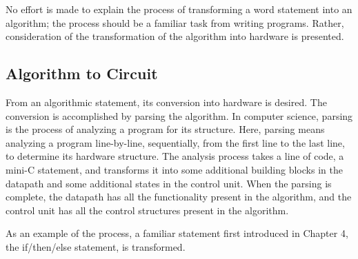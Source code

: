 No effort is made to explain the process of transforming a word statement
into an algorithm; the process should be a familiar task from writing 
programs.  Rather, consideration of the transformation
of the algorithm into hardware is presented.

\subsection{Algorithm to Circuit}
From an algorithmic statement, its conversion into hardware is desired.
The conversion  is accomplished by parsing the algorithm.  In 
computer science, parsing is the process of analyzing a program for its 
structure.  Here, parsing means analyzing
a program line-by-line, sequentially, from the first line to the last line, to 
determine its hardware structure.  The analysis process takes a line 
of code, a mini-C statement, and transforms it into some additional
building blocks in the datapath and some additional states in
the control unit.  When the parsing is complete, the datapath 
has all the functionality present in the algorithm, and the control
unit has all the control structures present in the algorithm.

As an example of the process, a familiar statement first introduced
in Chapter 4, the if/then/else statement, is transformed.

